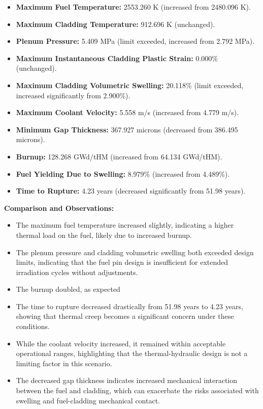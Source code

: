 \documentclass[11pt,a4paper,twoside]{article}
\begin{document}
\begin{itemize}
    \item \textbf{Maximum Fuel Temperature:} 2553.260 K (increased from 2480.096 K).
    \item \textbf{Maximum Cladding Temperature:} 912.696 K (unchanged).
    \item \textbf{Plenum Pressure:} 5.409 MPa (limit exceeded, increased from 2.792 MPa).
    \item \textbf{Maximum Instantaneous Cladding Plastic Strain:} 0.000\% (unchanged).
    \item \textbf{Maximum Cladding Volumetric Swelling:} 20.118\% (limit exceeded, increased significantly from 2.900\%).
    \item \textbf{Maximum Coolant Velocity:} 5.558 m/s (increased from 4.779 m/s).
    \item \textbf{Minimum Gap Thickness:} 367.927 microns (decreased from 386.495 microns).
    \item \textbf{Burnup:} 128.268 GWd/tHM (increased from 64.134 GWd/tHM).
    \item \textbf{Fuel Yielding Due to Swelling:} 8.979\% (increased from 4.489\%).
    \item \textbf{Time to Rupture:} 4.23 years (decreased significantly from 51.98 years).
\end{itemize}

\textbf{Comparison and Observations:}
\begin{itemize}
    \item The maximum fuel temperature increased slightly, indicating a higher thermal load on the fuel, likely due to increased burnup.
    \item The plenum pressure and cladding volumetric swelling both exceeded design limits, indicating that the fuel pin design is insufficient for extended irradiation cycles without adjustments.
    \item The burnup doubled, as expected
    \item The time to rupture decreased drastically from 51.98 years to 4.23 years, showing that thermal creep becomes a significant concern under these conditions.
    \item While the coolant velocity increased, it remained within acceptable operational ranges, highlighting that the thermal-hydraulic design is not a limiting factor in this scenario.
    \item The decreased gap thickness indicates increased mechanical interaction between the fuel and cladding, which can exacerbate the risks associated with swelling and fuel-cladding mechanical contact.
\end{itemize}
\end{document}
